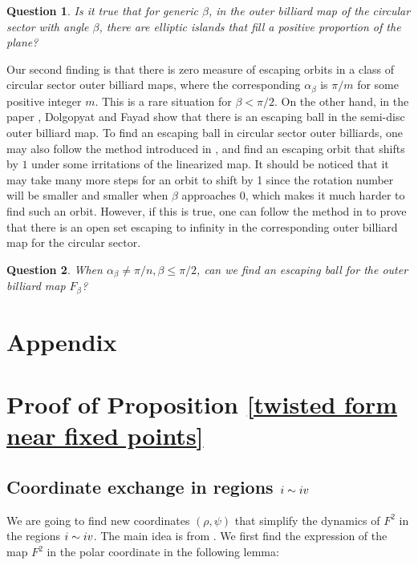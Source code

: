 \documentclass{article}
\def \Rone{\uppercase\expandafter{\romannumeral1}}
\def \Rfour{\uppercase\expandafter{\romannumeral4}}
\numberwithin{figure}{section}
\numberwithin{equation}{section}
\newtheorem{conjecture}{Question}
\theoremstyle{remark}
\theoremstyle{definition}
\begin{document}
\begin{conjecture}
	Is it true that for generic $\beta$, in the outer billiard map of the circular sector with angle $\beta$, there are elliptic islands that fill a positive proportion of the plane?
\end{conjecture}




Our second finding is that there is zero measure of escaping orbits in a class of circular sector outer billiard maps, where the corresponding $\alpha_\beta$ is $\pi/m$ for some positive integer $m$. This is a rare situation for $\beta<\pi/2$. On the other hand, in the paper \cite{dolgopyat_unbounded_2009}, Dolgopyat and Fayad show that there is an escaping ball in the semi-disc outer billiard map.
To find an escaping ball in circular sector outer billiards, one may also follow the method introduced in \cite{dolgopyat_unbounded_2009}, and find an escaping orbit that shifts by $1$ under some irritations of the linearized map. It should be noticed that it may take many more steps for an orbit to shift by 1 since the rotation number will be smaller and smaller when $\beta$ approaches $0$, which makes it much harder to find such an orbit.
However, if this is true, one can follow the method in \cite{dolgopyat_unbounded_2009} to  prove that there is an open set escaping to infinity in the corresponding outer billiard map for the circular sector. 
\begin{conjecture}
When $\alpha_\beta\neq\pi/n, \beta\leq\pi/2$, can we find an escaping ball for the outer billiard map $F_\beta$?
\end{conjecture}




\section*{Appendix}\label{appendix}

\appendix
\section{Proof of Proposition \texorpdfstring{\ref{twisted form near fixed points}}{}}\label{proof of proposition B}
\subsection{Coordinate exchange in regions $\Rone\sim\Rfour$}
We are going to find new coordinates $(\rho,\psi)$ that simplify the dynamics of $F^2$ in the regions $\Rone\sim\Rfour$. The main idea is from \cite{dolgopyat_unbounded_2009}. We first find the expression of the map $F^2$ in the polar coordinate in the following lemma:
\end{document}
